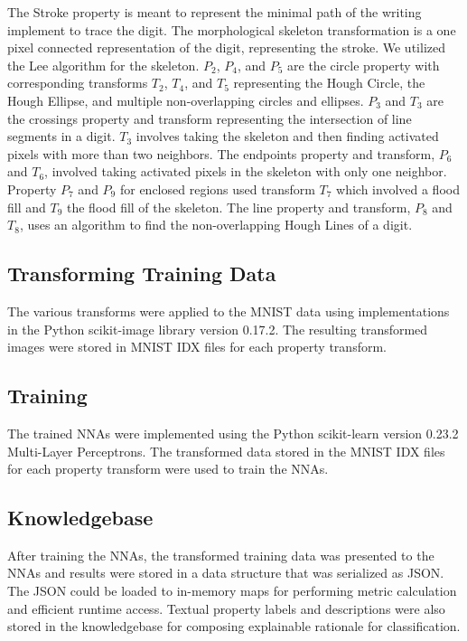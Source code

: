\documentclass[conference]{IEEEtran}
\begin{document}
The Stroke property is meant to represent the minimal path of the writing implement to trace the digit.  The morphological skeleton transformation is a one pixel connected representation of the digit,  representing the stroke.  We utilized the Lee\cite{Lee1994} algorithm for the skeleton.
$P_2$, $P_4$, and $P_5$ are the circle property with corresponding transforms $T_2$, $T_4$, and $T_5$ representing the Hough Circle, the Hough Ellipse, and multiple non-overlapping circles and ellipses.
$P_3$ and $T_3$ are the crossings property and transform representing the intersection of line segments in a digit.  $T_3$ involves taking the skeleton and then finding activated pixels with more than two neighbors.   The endpoints property and transform, $P_6$ and $T_6$, involved taking activated pixels in the skeleton with only one neighbor.
Property $P_7$ and $P_9$ for enclosed regions used transform $T_7$ which involved a flood fill and $T_9$ the flood fill of the skeleton.  The line property and transform, $P_8$ and $T_8$, uses an algorithm to find the non-overlapping Hough Lines of a digit.

\subsection{Transforming Training Data}

The various transforms were applied to the MNIST data using implementations in the Python scikit-image\cite{scikitimage} library version 0.17.2.  The resulting transformed images were stored in MNIST IDX files for each property transform.

\subsection{Training}

The trained NNAs were implemented using the Python scikit-learn\cite{scikitlearn} version 0.23.2 Multi-Layer Perceptrons.  The transformed data stored in the MNIST IDX files for each property transform were used to train the NNAs.

\subsection{Knowledgebase}

After training the NNAs,  the transformed training data was presented to the NNAs and results were stored in a data structure that was serialized as JSON.  The JSON could be loaded to in-memory maps for performing metric calculation and efficient runtime access.  Textual property labels and descriptions were also stored in the knowledgebase for composing explainable rationale for classification.
\end{document}
